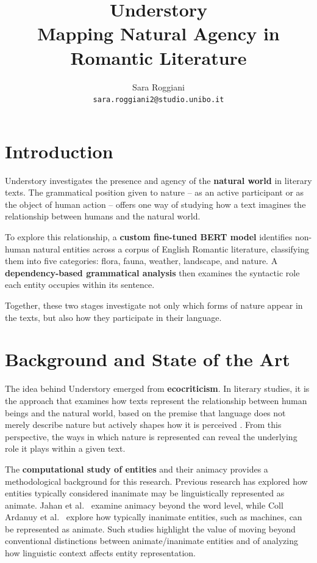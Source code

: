 \documentclass[11pt]{article}
\title{
  \LARGE Understory \\[0.4em]
  \large Mapping Natural Agency in Romantic Literature
}
\author{Sara Roggiani \\
    {\tt sara.roggiani2@studio.unibo.it}
}
\begin{document}
\maketitle

\section{Introduction}
Understory investigates the presence and agency of the \textbf{natural world} in literary texts. The grammatical position given to nature – as an active participant or as the object of human action – offers one way of studying how a text imagines the relationship between humans and the natural world.

To explore this relationship, a \textbf{custom fine-tuned BERT model} identifies non-human natural entities across a corpus of English Romantic literature, classifying them into five categories: flora, fauna, weather, landscape, and nature. A \textbf{dependency-based grammatical analysis} then examines the syntactic role each entity occupies within its sentence.

Together, these two stages investigate not only which forms of nature appear in the texts, but also how they participate in their language.


\section{Background and State of the Art}

The idea behind Understory emerged from \textbf{ecocriticism}. In literary studies, it is the approach that examines how texts represent the relationship between human beings and the natural world, based on the premise that language does not merely describe nature but actively shapes how it is perceived \cite{bate:91}. From this perspective, the ways in which nature is represented can reveal the underlying role it plays within a given text.

The \textbf{computational study of entities} and their animacy provides a methodological background for this research. Previous research has explored how entities typically considered inanimate may be linguistically represented as animate. Jahan et al.~ examine animacy beyond the word level, while Coll Ardanuy et al.~ explore how typically inanimate entities, such as machines, can be represented as animate. Such studies highlight the value of moving beyond conventional distinctions between animate/inanimate entities and of analyzing how linguistic context affects entity representation.
\end{document}
